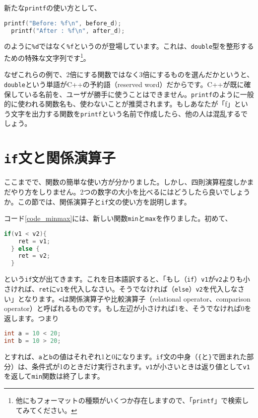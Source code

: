 新たな\texttt{printf}の使い方として、
\begin{lstlisting}[language=c++]
  printf("Before: %f\n", before_d); 
  printf("After : %f\n", after_d); 
\end{lstlisting} 
のように\texttt{\%d}ではなく\texttt{\%f}というのが登場しています。これは、\texttt{double}型を整形するための特殊な文字列です\footnote{他にもフォーマットの種類がいくつか存在しますので、「\texttt{printf}」で検索してみてください。}。

なぜこれらの例で、2倍にする関数ではなく3倍にするものを選んだかというと、\texttt{double}という単語がC++の予約語（reserved word）だからです。C++が既に確保している名前を、ユーザが勝手に使うことはできません。\texttt{printf}のように一般的に使われる関数名も、使わないことが推奨されます。もしあなたが「f」という文字を出力する関数を\texttt{printf}という名前で作成したら、他の人は混乱するでしょう。

\section{\texttt{if}文と関係演算子}

ここまでで、関数の簡単な使い方が分かりました。しかし、四則演算程度しかまだやり方をしりません。2つの数字の大小を比べるにはどうしたら良いでしょうか。この節では、関係演算子と\texttt{if}文の使い方を説明します。



コード\ref{code_minmax}には、新しい関数\texttt{min}と\texttt{max}を作りました。初めて、
\begin{lstlisting}[language=c++]
  if(v1 < v2){ 
    ret = v1; 
  } else { 
    ret = v2; 
  }
\end{lstlisting}
という\texttt{if}文が出てきます。これを日本語訳すると、「もし（\texttt{if}）\texttt{v1}が\texttt{v2}よりも小さければ、\texttt{ret}に\texttt{v1}を代入しなさい。そうでなければ（\texttt{else}）\texttt{v2}を代入しなさい」となります。\texttt{<}は関係演算子や比較演算子（relational operator、comparison operator）と呼ばれるものです。もし左辺が小さければ1を、そうでなければ0を返します。つまり
\begin{lstlisting}[language=c++]
int a = 10 < 20;
int b = 10 > 20;
\end{lstlisting}
とすれば、\texttt{a}と\texttt{b}の値はそれぞれ1と0になります。\texttt{if}文の中身（\texttt{\{}と\texttt{\}}で囲まれた部分）は、条件式が1のときだけ実行されます。\texttt{v1}が小さいときは返り値として\texttt{v1}を返して\texttt{min}関数は終了します。

